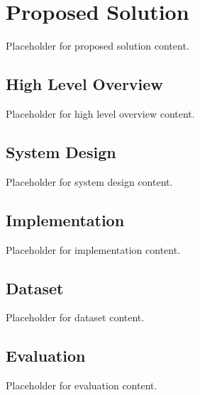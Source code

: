 \chapter{Proposed Solution}
Placeholder for proposed solution content.
\section{High Level Overview}
Placeholder for high level overview content.
\section{System Design}
Placeholder for system design content.
\section{Implementation}
Placeholder for implementation content.
\section{Dataset}
Placeholder for dataset content.
\section{Evaluation}
Placeholder for evaluation content.
